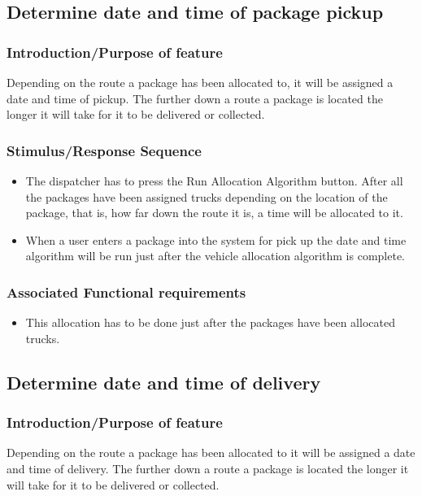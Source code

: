 \documentclass[paper=a4, fontsize=11pt]{scrartcl} %
\numberwithin{equation}{section} %
\numberwithin{figure}{section} %
\numberwithin{table}{section} %
\begin{document}
\subsection{Determine date and time of package pickup}
\subsubsection{Introduction/Purpose of feature}
Depending on the route a package has been allocated to, it will be assigned a date and time of pickup. The further down a route a package is located the longer it will take for it to be delivered or collected.  
\subsubsection{Stimulus/Response Sequence}
\begin{itemize}
			\item The dispatcher has to press the Run Allocation Algorithm button. After all the packages have been assigned trucks depending on the location of the package, that is, how far down the route it is, a time will be allocated to it. 
			\item When a user enters a package into the system for pick up the date and time algorithm will be run just after the vehicle allocation algorithm is complete.
\end{itemize}

 
\subsubsection{Associated Functional requirements}
\begin{itemize}
\item This allocation has to be done just after the packages have been allocated trucks.
\end{itemize}
			

\subsection{Determine date and time of delivery}
\subsubsection{Introduction/Purpose of feature}
Depending on the route a package has been allocated to it will be assigned a date and time of delivery. The further down a route a package is located the longer it will take for it to be delivered or collected.  
\end{document}
